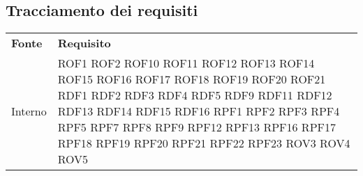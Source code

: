 \subsection{Tracciamento dei requisiti}
\begin{longtable}{| p{5cm} | p{5cm} |}
		\rowcolor{LightBlue}
		\color{white}\bfseries Fonte & \color{white}\bfseries Requisito \\[0.25cm]
		Interno & 	ROF1 \newline
					ROF2 \newline
					ROF10 \newline
					ROF11 \newline
					ROF12 \newline
					ROF13 \newline
					ROF14 \newline
					ROF15 \newline
					ROF16 \newline
					ROF17 \newline
					ROF18 \newline
					ROF19 \newline
					ROF20 \newline
					ROF21 \newline
					RDF1 \newline
					RDF2 \newline
					RDF3 \newline
					RDF4 \newline
					RDF5 \newline
					RDF9 \newline
					RDF11 \newline
					RDF12 \newline
					RDF13 \newline
					RDF14 \newline
					RDF15 \newline
					RDF16 \newline
					RPF1 \newline
					RPF2 \newline
					RPF3 \newline
					RPF4 \newline
					RPF5 \newline
					RPF7 \newline
					RPF8 \newline
					RPF9 \newline
					RPF12 \newline
					RPF13 \newline
					RPF16 \newline
					RPF17 \newline
					RPF18 \newline
					RPF19 \newline
					RPF20 \newline
					RPF21 \newline
					RPF22 \newline
					RPF23 \newline
					ROV3 \newline
					ROV4 \newline
					ROV5 \newline
					 \\ \hline
					

\end{longtable}
